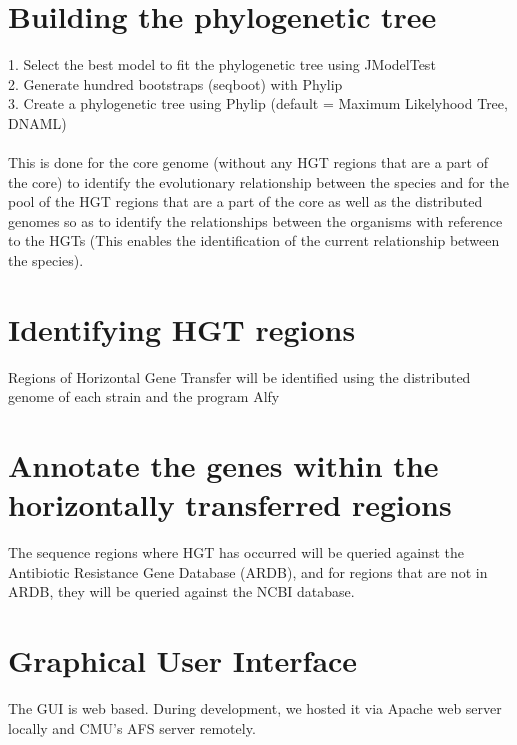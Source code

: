 \documentclass[11pt]{article}
\begin{document}
\section{Building the phylogenetic tree}
1. Select the best model to fit the phylogenetic tree using JModelTest \cite{jModelTest}\\
2. Generate hundred bootstraps (seqboot) with Phylip \cite{phylip} \\
3. Create a phylogenetic tree using Phylip (default = Maximum Likelyhood Tree, DNAML)\\\\
This is done for the core genome (without any HGT regions that are a part
of the core) to identify the evolutionary relationship between the species
and for the pool of the HGT regions that are a part of the core as well as
the distributed genomes so as to identify the relationships between the
organisms with reference to the HGTs (This enables the identification of
the current relationship between the species).\\

\section{Identifying HGT regions}
Regions of Horizontal Gene Transfer will be identified using the distributed genome of each strain and the program Alfy \cite{Alfy}

\section{Annotate the genes within the horizontally transferred regions}
The sequence regions where HGT has occurred will be queried against the Antibiotic Resistance Gene Database (ARDB),  and for regions that are not in ARDB, they will be queried against the NCBI database.\\

\section{Graphical User Interface}
The GUI is web based. During development, we hosted it via Apache web server locally and CMU's AFS server remotely.
\bigskip
\end{document}
